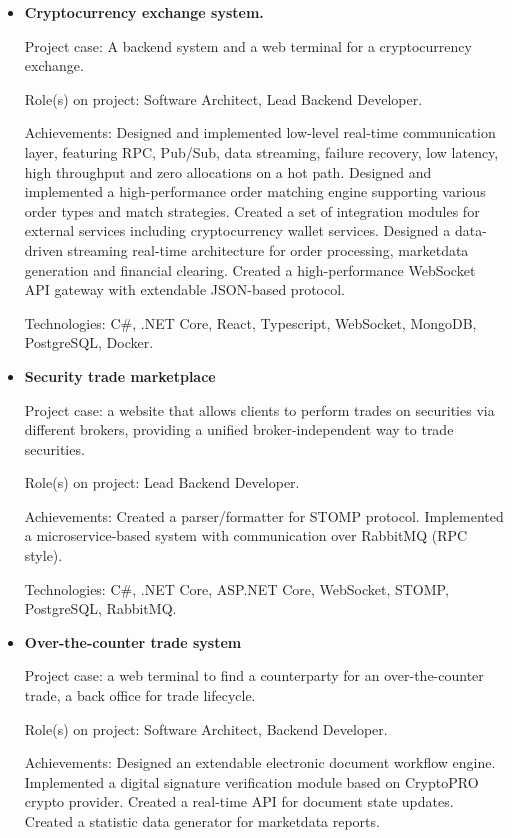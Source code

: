\documentclass{article}
\begin{document}
\begin{itemize}
{        Technologies: C\#, .NET 5, ASP.NET Core, Blazor Server, SBE binary encoding, Twime binary protocol.
    }
    \item {
        \textbf{Cryptocurrency exchange system.}
        
        Project case: A backend system and a web terminal for a cryptocurrency exchange.
        
        Role(s) on project: Software Architect, Lead Backend Developer.
        
        Achievements:
        Designed and implemented low-level real-time communication layer, featuring RPC, Pub/Sub, data streaming, failure recovery, low latency, high throughput and zero allocations on a hot path.
        Designed and implemented a high-performance order matching engine supporting various order types and match strategies.
        Created a set of integration modules for external services including cryptocurrency wallet services.
        Designed a data-driven streaming real-time architecture for order processing, marketdata generation and financial clearing.
        Created a high-performance WebSocket API gateway with extendable JSON-based protocol.
        
        Technologies: C\#, .NET Core, React, Typescript, WebSocket, MongoDB, PostgreSQL, Docker.
    }
    \item {
        \textbf{Security trade marketplace}
        
        Project case: a website that allows clients to perform trades on securities via different brokers,
        providing a unified broker-independent way to trade securities.
        
        Role(s) on project: Lead Backend Developer.
        
        Achievements:
        Created a parser/formatter for STOMP protocol.
        Implemented a microservice-based system with communication over RabbitMQ (RPC style).
        
        Technologies: C\#, .NET Core, ASP.NET Core, WebSocket, STOMP, PostgreSQL, RabbitMQ.
    }
    \item {
        \textbf{Over-the-counter trade system}
        
        Project case: a web terminal to find a counterparty for an over-the-counter trade,
        a back office for trade lifecycle.
        
        Role(s) on project: Software Architect, Backend Developer.
        
        Achievements:
        Designed an extendable electronic document workflow engine.
        Implemented a digital signature verification module based on CryptoPRO crypto provider.
        Created a real-time API for document state updates.
        Created a statistic data generator for marketdata reports.
        
}
\end{itemize}
\end{document}
